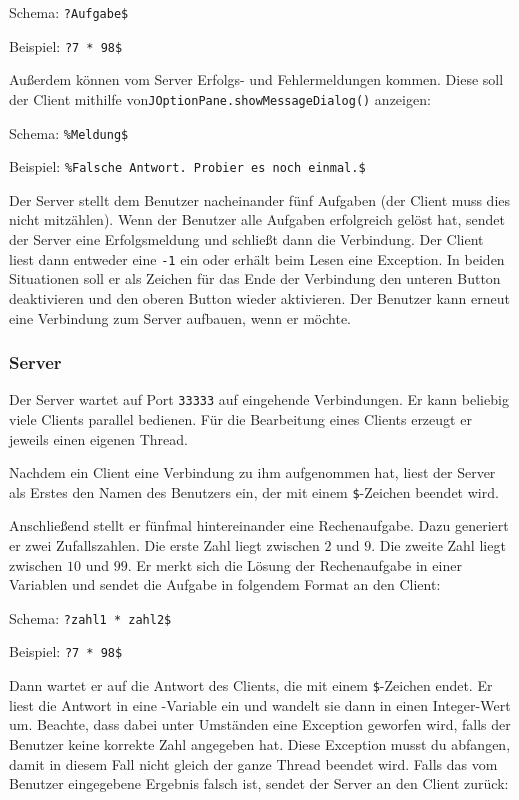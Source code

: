 Schema: \lstinline|?Aufgabe$|	

Beispiel: \lstinline|?7 * 98$|

Außerdem können vom Server Erfolgs- und Fehlermeldungen kommen. Diese soll der
Client mithilfe von\linebreak \lstinline|JOptionPane.showMessageDialog()|
anzeigen:

Schema: \lstinline|%Meldung$|	

Beispiel: \lstinline|%Falsche Antwort. Probier es noch einmal.$|

Der Server stellt dem Benutzer nacheinander fünf Aufgaben (der Client muss dies
nicht mitzählen). Wenn der Benutzer alle Aufgaben erfolgreich gelöst hat,
sendet der Server eine Erfolgsmeldung und schließt dann die Verbindung. Der
Client liest dann entweder eine \lstinline|-1| ein oder erhält beim Lesen eine
Exception. In beiden Situationen soll er als Zeichen für das Ende der Verbindung
den unteren Button deaktivieren und den oberen Button wieder aktivieren. Der
Benutzer kann erneut eine Verbindung zum Server aufbauen, wenn er möchte.

\subsubsection{Server}

Der Server wartet auf Port \lstinline|33333| auf eingehende Verbindungen. Er
kann beliebig viele Clients parallel bedienen. Für die Bearbeitung eines
Clients erzeugt er jeweils einen eigenen Thread.

Nachdem ein Client eine Verbindung zu ihm aufgenommen hat, liest der Server als
Erstes den Namen des Benutzers ein, der mit einem \lstinline|$|-Zeichen
beendet wird.

Anschließend stellt er fünfmal hintereinander eine Rechenaufgabe. Dazu
generiert er zwei Zufallszahlen. Die erste Zahl liegt zwischen $2$ und $9$. Die
zweite Zahl liegt zwischen $10$ und $99$. Er merkt sich die Lösung der
Rechenaufgabe in einer Variablen und sendet die Aufgabe in folgendem Format an
den Client:

Schema: \lstinline|?zahl1 * zahl2$|	

Beispiel: \lstinline|?7 * 98$|

Dann wartet er auf die Antwort des Clients, die mit einem \lstinline|$|-Zeichen
endet. Er liest die Antwort in eine -Variable ein und wandelt sie dann in
einen Integer-Wert um. Beachte, dass dabei unter Umständen eine Exception
geworfen wird, falls der Benutzer keine korrekte Zahl angegeben hat. Diese
Exception musst du abfangen, damit in diesem Fall nicht gleich der ganze
Thread beendet wird. Falls das vom Benutzer eingegebene Ergebnis falsch ist,
sendet der Server an den Client zurück:

